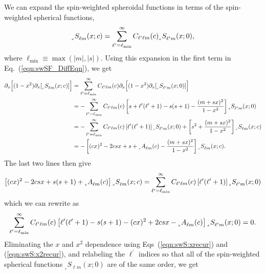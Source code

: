 \documentclass[11pt]{article}
\newcommand{\swS}[5][]{{}_{{}_{#2}}S^{#1}_{#3}(#4;#5)}
\newcommand{\scA}[4][]{{}_{{}_{#2}}A^{#1}_{#3}(#4)}
\begin{document}
We can expand the spin-weighted spheroidal functions in terms of the
spin-weighted spherical functions,
\begin{equation}
  \swS{s}{\ell{m}}{x}{c} = \sum_{\ell^\prime=\ell_{\mbox{\tiny min}}}^\infty
      C_{\ell^\prime\ell{m}}(c)\swS{s}{\ell^\prime{m}}{x}{0},
\end{equation}
where $\ell_{\mbox{min}}\equiv\max(|m|,|s|)$.  Using this expansion in
the first term in Eq.~(\ref{eqn:swSF_DiffEqn}), we get
\begin{align}
   \partial_x \Big[ (1-x^2)\partial_x [\swS{s}{\ell{m}}{x}{c}]\Big]
   &= \sum_{\ell^\prime=\ell_{\mbox{\tiny min}}}^\infty
      C_{\ell^\prime\ell{m}}(c)
      \partial_x \Big[ (1-x^2)\partial_x [\swS{s}{\ell^\prime{m}}{x}{0}]\Big] \\
   &= -\sum_{\ell^\prime=\ell_{\mbox{\tiny min}}}^\infty C_{\ell^\prime\ell{m}}(c)
      \left[s + \ell^\prime(\ell^\prime+1)-s(s+1)-\frac{(m+sx)^2}{1-x^2}\right]
      \swS{s}{\ell^\prime{m}}{x}{0} \\
   &= -\sum_{\ell^\prime=\ell_{\mbox{\tiny min}}}^\infty C_{\ell^\prime\ell{m}}(c)
      \left[\ell^\prime(\ell^\prime+1)\right]
      \swS{s}{\ell^\prime{m}}{x}{0} +
      \left[s^2+\frac{(m+sx)^2}{1-x^2}\right]
      \swS{s}{\ell{m}}{x}{c} \\
   &= -\left[(cx)^2 - 2csx + s+\scA{s}{\ell{m}}{c}-\frac{(m+sx)^2}{1-x^2}\right]
      \swS{s}{\ell{m}}{x}{c}.
\end{align}
The last two lines then give
\begin{equation}
  \left[(cx)^2 - 2csx + s(s+1) +\scA{s}{\ell{m}}{c}\right]
  \swS{s}{\ell{m}}{x}{c} =
  \sum_{\ell^\prime=\ell_{\mbox{\tiny min}}}^\infty C_{\ell^\prime\ell{m}}(c)
  \left[\ell^\prime(\ell^\prime+1)\right]
  \swS{s}{\ell^\prime{m}}{x}{0}
\end{equation}
which we can rewrite as
\begin{equation}
   \sum_{\ell^\prime=\ell_{\mbox{\tiny min}}}^\infty C_{\ell^\prime\ell{m}}(c)
   \left[\ell^\prime(\ell^\prime+1) -s(s+1) - (cx)^2 
     + 2csx -\scA{s}{\ell{m}}{c} \right]
   \swS{s}{\ell^\prime{m}}{x}{0} = 0.
\end{equation}
Eliminating the $x$ and $x^2$ dependence using Eqs~(\ref{eqn:swS:xrecur}) and (\ref{eqn:swS:x2recur}), and relabeling the $\ell^\prime$ indices so that all of the spin-weighted spherical functions $\swS{s}{\ell{m}}{x}{0}$ are of the same order, we get
\end{document}
